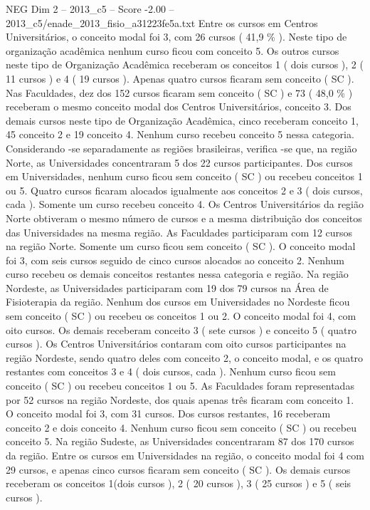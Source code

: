 \begin{textsample}{NEG Dim 2 – 2013\_c5 – Score -2.00 – 2013\_c5/enade\_2013\_fisio\_a31223fe5a.txt}
Entre os cursos em Centros Universitários, o conceito modal foi 3, com 26 cursos ( 41,9 \% ).
Neste tipo de organização acadêmica nenhum curso ficou com conceito 5.
Os outros cursos neste tipo de Organização Acadêmica receberam os conceitos 1 ( dois cursos ), 2 ( 11 cursos ) e 4 ( 19 cursos ).
Apenas quatro cursos ficaram sem conceito ( SC ).
Nas Faculdades, dez dos 152 cursos ficaram sem conceito ( SC ) e 73 ( 48,0 \% ) receberam o mesmo conceito modal dos Centros Universitários, conceito 3.
Dos demais cursos neste tipo de Organização Acadêmica, cinco receberam conceito 1, 45 conceito 2 e 19 conceito 4.
Nenhum curso recebeu conceito 5 nessa categoria.
Considerando -se separadamente as regiões brasileiras, verifica -se que, na região Norte, as Universidades concentraram 5 dos 22 cursos participantes.
Dos cursos em Universidades, nenhum curso ficou sem conceito ( SC ) ou recebeu conceitos 1 ou 5.
Quatro cursos ficaram alocados igualmente aos conceitos 2 e 3 ( dois cursos, cada ).
Somente um curso recebeu conceito 4.
Os Centros Universitários da região Norte obtiveram o mesmo número de cursos e a mesma distribuição dos conceitos das Universidades na mesma região.
As Faculdades participaram com 12 cursos na região Norte.
Somente um curso ficou sem conceito ( SC ).
O conceito modal foi 3, com seis cursos seguido de cinco cursos alocados ao conceito 2.
Nenhum curso recebeu os demais conceitos restantes nessa categoria e região.
Na região Nordeste, as Universidades participaram com 19 dos 79 cursos na Área de Fisioterapia da região.
Nenhum dos cursos em Universidades no Nordeste ficou sem conceito ( SC ) ou recebeu os conceitos 1 ou 2.
O conceito modal foi 4, com oito cursos.
Os demais receberam conceito 3 ( sete cursos ) e conceito 5 ( quatro cursos ).
Os Centros Universitários contaram com oito cursos participantes na região Nordeste, sendo quatro deles com conceito 2, o conceito modal, e os quatro restantes com conceitos 3 e 4 ( dois cursos, cada ).
Nenhum curso ficou sem conceito ( SC ) ou recebeu conceitos 1 ou 5.
As Faculdades foram representadas por 52 cursos na região Nordeste, dos quais apenas três ficaram com conceito 1.
O conceito modal foi 3, com 31 cursos.
Dos cursos restantes, 16 receberam conceito 2 e dois conceito 4.
Nenhum curso ficou sem conceito ( SC ) ou recebeu conceito 5.
Na região Sudeste, as Universidades concentraram 87 dos 170 cursos da região.
Entre os cursos em Universidades na região, o conceito modal foi 4 com 29 cursos, e apenas cinco cursos ficaram sem conceito ( SC ).
Os demais cursos receberam os conceitos 1(dois cursos ), 2 ( 20 cursos ), 3 ( 25 cursos ) e 5 ( seis cursos ).

\end{textsample}
